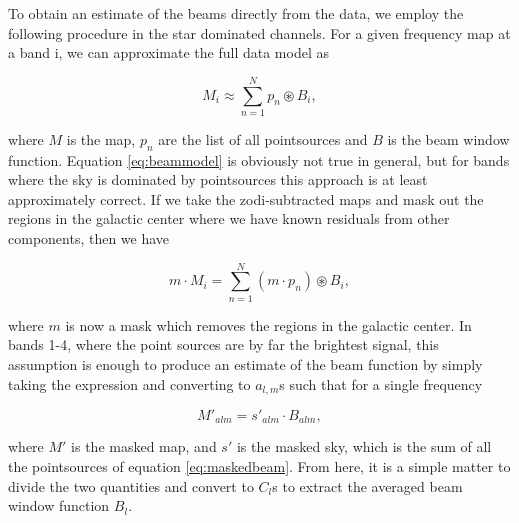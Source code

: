 \documentclass{aa}
\begin{document}
To obtain an estimate of the beams directly from the data, we employ the following procedure in the star dominated channels. For a given frequency map at a band i, we can approximate the full data model as 

\begin{equation}
M_i \approx \sum_{n=1}^{N} p_n \circledast B_i,
\label{eq:beammodel}
\end{equation}

where $M$ is the map, $p_n$ are the list of all pointsources and $B$ is the beam window function. Equation \ref{eq:beammodel} is obviously not true in general, but for bands where the sky is dominated by pointsources this approach is at least approximately correct. If we take the zodi-subtracted maps and mask out the regions in the galactic center where we have known residuals from other components, then we have 

\begin{equation}
m \cdot M_i = \sum_{n=1}^{N} (m \cdot p_n) \circledast B_i,
\label{eq:maskedbeam}
\end{equation}

where $m$ is now a mask which removes the regions in the galactic center. In bands 1-4, where the point sources are by far the brightest signal, this assumption is enough to produce an estimate of the beam function by simply taking the expression and converting to $a_{l,m}$s such that for a single frequency

\begin{equation}
M'_{alm} = s'_{alm} \cdot B_{alm},
\label{eq:maskedbeam}
\end{equation}

where $M'$ is the masked map, and $s'$ is the masked sky, which is the sum of all the pointsources of equation \ref{eq:maskedbeam}. From here, it is a simple matter to divide the two quantities and convert to $C_l$s to extract the averaged beam window function $B_l$.
\end{document}
